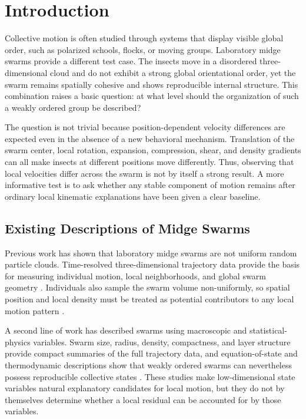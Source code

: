 \section{Introduction}

Collective motion is often studied through systems that display visible global
order, such as polarized schools, flocks, or moving groups. Laboratory midge
swarms provide a different test case. The insects move in a disordered
three-dimensional cloud and do not exhibit a strong global orientational order,
yet the swarm remains spatially cohesive and shows reproducible internal
structure. This combination raises a basic question: at what level should the
organization of such a weakly ordered group be described?

The question is not trivial because position-dependent velocity differences
are expected even in the absence of a new behavioral mechanism. Translation of
the swarm center, local rotation, expansion, compression, shear, and density
gradients can all make insects at different positions move differently. Thus,
observing that local velocities differ across the swarm is not by itself a
strong result. A more informative test is to ask whether any stable component
of motion remains after ordinary local kinematic explanations have been given
a clear baseline.

\subsection{Existing Descriptions of Midge Swarms}

Previous work has shown that laboratory midge swarms are not uniform random
particle clouds. Time-resolved three-dimensional trajectory data provide the
basis for measuring individual motion, local neighborhoods, and global swarm
geometry \cite{sinhuber2019_dataset}. Individuals also sample the swarm volume
non-uniformly, so spatial position and local density must be treated as
potential contributors to any local motion pattern
\cite{feng2023_sampling}.

A second line of work has described swarms using macroscopic and
statistical-physics variables. Swarm size, radius, density, compactness, and
layer structure provide compact summaries of the full trajectory data, and
equation-of-state and thermodynamic descriptions show that weakly ordered
swarms can nevertheless possess reproducible collective states
\cite{sinhuber2021_eos,reynolds2021_thermodynamic}. These studies make
low-dimensional state variables natural explanatory candidates for local
motion, but they do not by themselves determine whether a local residual can
be accounted for by those variables.

